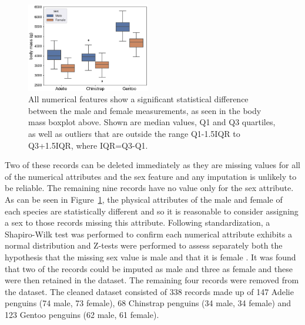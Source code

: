 \documentclass[12pt]{article}
\begin{document}
\begin{figure} %
  \centering
  \vspace{-0.5\baselineskip} %
  \includegraphics[width=0.48\textwidth]{sex.png} %
  \vspace{-0.5\baselineskip} %
  \caption{All numerical features show a significant statistical difference between the male and female measurements, as seen in the body mass boxplot above. Shown are median values, Q1 and Q3 quartiles, as well as outliers that are outside the range Q1-1.5IQR to Q3+1.5IQR, where IQR=Q3-Q1.}
  \vspace{-0.5\baselineskip} %
  \label{fig:sex}
\end{figure}   

Two of these records can be deleted immediately as they are missing 
values for all of the numerical attributes and the sex feature 
and any imputation is unlikely to be reliable. 
The remaining nine records have no value only for the sex attribute. 
As can be seen in Figure~\ref{fig:sex}, the physical attributes of the male and female of each species 
are statistically different and so it is reasonable to consider assigning a sex 
to those records missing this attribute. Following standardization, 
a Shapiro-Wilk test was performed to confirm each numerical attribute exhibits a normal distribution \cite{shapiro1965analysis} 
and Z-tests were performed to assess separately both the 
hypothesis that the missing sex value is male and that it is female \cite{freedman2007statistics}. 
It was found that two of the records could be imputed as male and three as female 
and these were then retained in the dataset. 
The remaining four records were removed from the dataset. 
The cleaned dataset consisted of 338 records made up of 147 Adelie penguins 
(74 male, 73 female), 68 Chinstrap penguins (34 male, 34 female) and 123 Gentoo penguins (62 male, 61 female).
\end{document}
